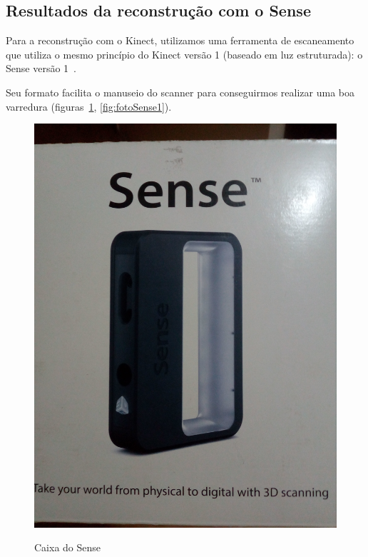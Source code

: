 \newpage

\subsection{Resultados da reconstrução com o Sense}
Para a reconstrução com o Kinect, utilizamos uma ferramenta de escaneamento que utiliza o mesmo princípio do Kinect versão 1 (baseado em luz estruturada): o Sense versão 1~\cite{3DSystems}.

Seu formato facilita o manuseio do scanner para conseguirmos realizar uma boa varredura (figuras~\ref{fig:fotoSense0}, \ref{fig:fotoSense1}).

\begin{figure}[!h]
	\centering
	\caption{Caixa do Sense}
	\includegraphics[width=0.75\linewidth]{figs/senseFoto1.jpg}
		\label{fig:fotoSense0}
\end{figure}

